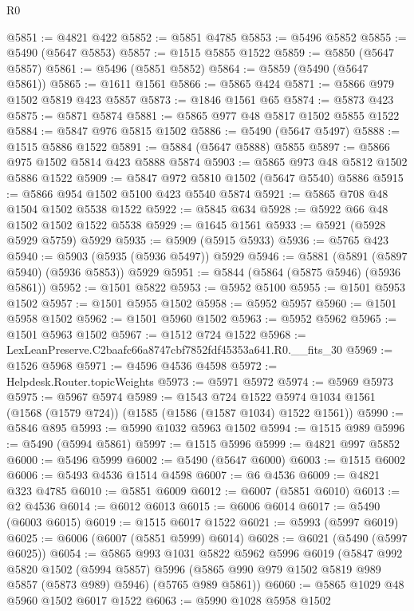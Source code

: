 \begin{lexlean}{R0}
\begin{coremodule}
@5851 := @4821 @422
@5852 := @5851 @4785
@5853 := @5496 @5852
@5855 := @5490 (@5647 @5853)
@5857 := @1515 @5855 @1522
@5859 := @5850 (@5647 @5857)
@5861 := @5496 (@5851 @5852)
@5864 := @5859 (@5490 (@5647 @5861))
@5865 := @1611 @1561
@5866 := @5865 @424
@5871 := @5866 @979 @1502 @5819 @423 @5857
@5873 := @1846 @1561 @65
@5874 := @5873 @423
@5875 := @5871 @5874
@5881 := @5865 @977 @48 @5817 @1502 @5855 @1522
@5884 := @5847 @976 @5815 @1502
@5886 := @5490 (@5647 @5497)
@5888 := @1515 @5886 @1522
@5891 := @5884 (@5647 @5888) @5855
@5897 := @5866 @975 @1502 @5814 @423 @5888 @5874
@5903 := @5865 @973 @48 @5812 @1502 @5886 @1522
@5909 := @5847 @972 @5810 @1502 (@5647 @5540) @5886
@5915 := @5866 @954 @1502 @5100 @423 @5540 @5874
@5921 := @5865 @708 @48 @1504 @1502 @5538 @1522
@5922 := @5845 @634
@5928 := @5922 @66 @48 @1502 @1502 @1522 @5538
@5929 := @1645 @1561
@5933 := @5921 (@5928 @5929 @5759) @5929
@5935 := @5909 (@5915 @5933)
@5936 := @5765 @423
@5940 := @5903 (@5935 (@5936 @5497)) @5929
@5946 := @5881 (@5891 (@5897 @5940) (@5936 @5853)) @5929
@5951 := @5844 (@5864 (@5875 @5946) (@5936 @5861))
@5952 := @1501 @5822
@5953 := @5952 @5100
@5955 := @1501 @5953 @1502
@5957 := @1501 @5955 @1502
@5958 := @5952 @5957
@5960 := @1501 @5958 @1502
@5962 := @1501 @5960 @1502
@5963 := @5952 @5962
@5965 := @1501 @5963 @1502
@5967 := @1512 @724 @1522
@5968 := LexLeanPreserve.C2baafc66a8747cbf7852fdf45353a641.R0.__fits_30
@5969 := @1526 @5968
@5971 := @4596 @4536 @4598
@5972 := Helpdesk.Router.topicWeights
@5973 := @5971 @5972
@5974 := @5969 @5973
@5975 := @5967 @5974
@5989 := @1543
    @724
    @1522
    @5974
    @1034
    @1561
    (@1568 (@1579 @724))
    (@1585 (@1586 (@1587 @1034) @1522 @1561))
@5990 := @5846 @895
@5993 := @5990 @1032 @5963 @1502
@5994 := @1515 @989
@5996 := @5490 (@5994 @5861)
@5997 := @1515 @5996
@5999 := @4821 @997 @5852
@6000 := @5496 @5999
@6002 := @5490 (@5647 @6000)
@6003 := @1515 @6002
@6006 := @5493 @4536 @1514 @4598
@6007 := @6 @4536
@6009 := @4821 @323 @4785
@6010 := @5851 @6009
@6012 := @6007 (@5851 @6010)
@6013 := @2 @4536
@6014 := @6012 @6013
@6015 := @6006 @6014
@6017 := @5490 (@6003 @6015)
@6019 := @1515 @6017 @1522
@6021 := @5993 (@5997 @6019)
@6025 := @6006 (@6007 (@5851 @5999) @6014)
@6028 := @6021 (@5490 (@5997 @6025))
@6054 := @5865
    @993
    @1031
    @5822
    @5962
    @5996
    @6019
    (@5847
      @992
      @5820
      @1502
      (@5994 @5857)
      @5996
      (@5865 @990 @979 @1502 @5819 @989 @5857 (@5873 @989) @5946)
      (@5765 @989 @5861))
@6060 := @5865 @1029 @48 @5960 @1502 @6017 @1522
@6063 := @5990 @1028 @5958 @1502

\end{coremodule}
\end{lexlean}
